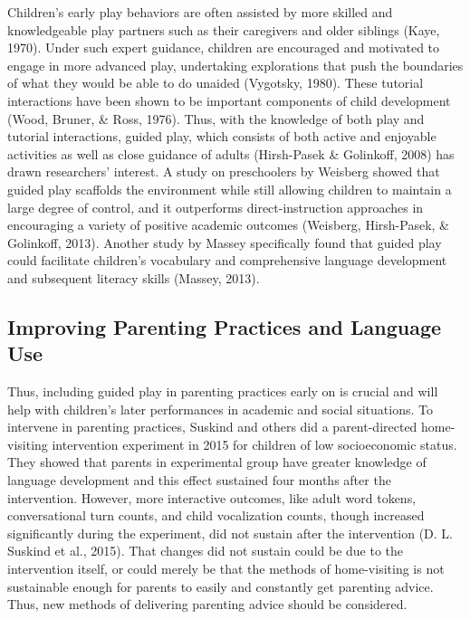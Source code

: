 \documentclass[10pt, letterpaper]{article}
\begin{document}
Children's early play behaviors are often assisted by more skilled and
knowledgeable play partners such as their caregivers and older siblings
(Kaye, 1970). Under such expert guidance, children are encouraged and
motivated to engage in more advanced play, undertaking explorations that
push the boundaries of what they would be able to do unaided (Vygotsky,
1980). These tutorial interactions have been shown to be important
components of child development (Wood, Bruner, \& Ross, 1976). Thus,
with the knowledge of both play and tutorial interactions, guided play,
which consists of both active and enjoyable activities as well as close
guidance of adults (Hirsh-Pasek \& Golinkoff, 2008) has drawn
researchers' interest. A study on preschoolers by Weisberg showed that
guided play scaffolds the environment while still allowing children to
maintain a large degree of control, and it outperforms
direct-instruction approaches in encouraging a variety of positive
academic outcomes (Weisberg, Hirsh-Pasek, \& Golinkoff, 2013). Another
study by Massey specifically found that guided play could facilitate
children's vocabulary and comprehensive language development and
subsequent literacy skills (Massey, 2013).

\subsection{Improving Parenting Practices and Language
Use}\label{improving-parenting-practices-and-language-use}

Thus, including guided play in parenting practices early on is crucial
and will help with children's later performances in academic and social
situations. To intervene in parenting practices, Suskind and others did
a parent-directed home-visiting intervention experiment in 2015 for
children of low socioeconomic status. They showed that parents in
experimental group have greater knowledge of language development and
this effect sustained four months after the intervention. However, more
interactive outcomes, like adult word tokens, conversational turn
counts, and child vocalization counts, though increased significantly
during the experiment, did not sustain after the intervention (D. L.
Suskind et al., 2015). That changes did not sustain could be due to the
intervention itself, or could merely be that the methods of
home-visiting is not sustainable enough for parents to easily and
constantly get parenting advice. Thus, new methods of delivering
parenting advice should be considered.
\end{document}
